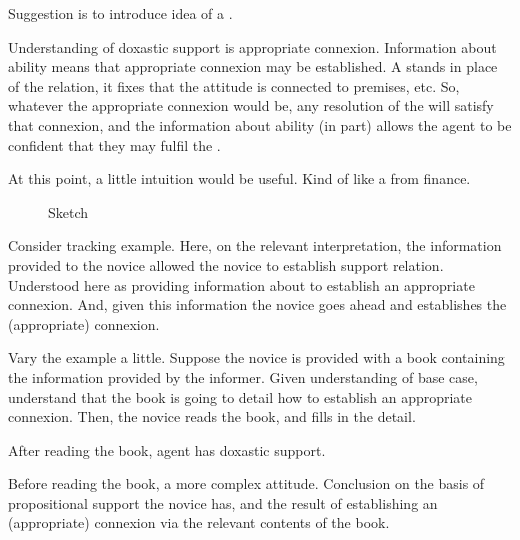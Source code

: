 \begin{note}[\future{}]
  Suggestion is to introduce idea of a \future{}.

  Understanding of doxastic support is appropriate connexion.
  Information about ability means that appropriate connexion may be established.
  A \future{} stands in place of the relation, it fixes that the attitude is connected to premises, etc.
  So, whatever the appropriate connexion would be, any resolution of the \future{} will satisfy that connexion, and the information about ability (in part) allows the agent to be confident that they may fulfil the \future{}.
\end{note}

\begin{note}[Intuition]
  At this point, a little intuition would be useful.
  Kind of like a \future{} from finance.
\end{note}

\begin{figure}[h!]
  \centering
  \caption{Sketch}
\end{figure}


\begin{note}
  Consider tracking example.
  Here, on the relevant interpretation, the information provided to the novice allowed the novice to establish support relation.
  Understood here as providing information about to establish an appropriate connexion.
  And, given this information the novice goes ahead and establishes the (appropriate) connexion.

  Vary the example a little.
  Suppose the novice is provided with a book containing the information provided by the informer.
  Given understanding of base case, understand that the book is going to detail how to establish an appropriate connexion.
  Then, the novice reads the book, and fills in the detail.

  After reading the book, agent has doxastic support.

  Before reading the book, a more complex attitude.
  Conclusion on the basis of propositional support the novice has, and the result of establishing an (appropriate) connexion via the relevant contents of the book.
\end{note}

